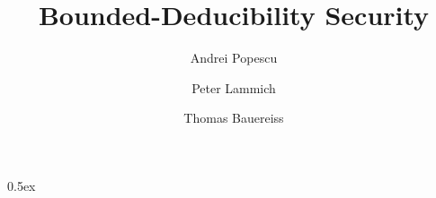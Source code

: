 \documentclass[11pt,a4paper]{article}
\begin{document}
\title{Bounded-Deducibility Security}
\author{Andrei Popescu \and Peter Lammich \and Thomas Bauereiss}
\date{}
\maketitle

\tableofcontents

\parindent 0pt\parskip 0.5ex







\end{document}
